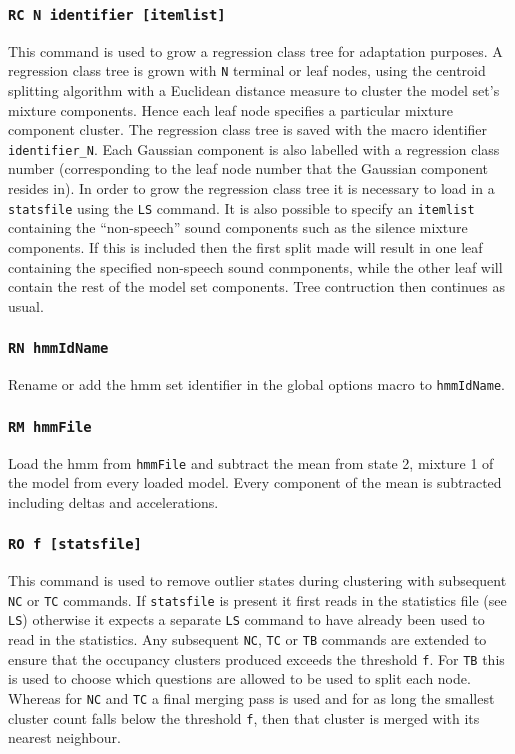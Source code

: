 \subsubsection*{\tt RC N identifier [itemlist]}

This command is used to grow a regression class tree for adaptation
purposes. A regression class tree is grown with
\texttt{N} terminal or leaf nodes, using the centroid splitting algorithm
with a Euclidean distance measure to cluster the model set's mixture
components. Hence each leaf node specifies a particular mixture
component cluster. The regression class tree is saved with the macro
identifier \texttt{identifier\_N}. Each Gaussian component is also
labelled with a regression class number (corresponding to the leaf
node number that the Gaussian component resides in). In order to grow
the regression class tree it is necessary to load in a \texttt{statsfile}
using the \texttt{LS} command. It is also possible to specify an
\texttt{itemlist} containing the ``non-speech'' sound components 
such as the silence mixture components. If this is included then the
first split made will result in one leaf containing the specified
non-speech sound conmponents, while the other leaf will contain the
rest of the model set components. Tree contruction then continues as usual.

\subsubsection*{\tt RN hmmIdName}

Rename or add the hmm set identifier in the global options macro to 
{\tt hmmIdName}.

\subsubsection*{\tt RM hmmFile}

Load the hmm from \texttt{hmmFile} and subtract the mean from state 2,
mixture 1 of the model from every loaded model.  Every component
of the mean is subtracted including deltas and accelerations.

\subsubsection*{\tt RO f [statsfile]}

This command is used to remove outlier states during clustering
with subsequent \texttt{NC} or \texttt{TC} commands.
If \texttt{statsfile} is present it first reads in the  statistics 
file (see \texttt{LS}) otherwise it expects a separate \texttt{LS} command
to have already been used to read in the statistics.
Any subsequent \texttt{NC}, \texttt{TC} or \texttt{TB} commands are
extended to ensure that the occupancy clusters produced exceeds the 
threshold \texttt{f}.
For \texttt{TB} this is used to choose which questions are allowed to
be used to split each node.   Whereas for \texttt{NC} and \texttt{TC} 
a final merging pass is used and for as long the smallest cluster count 
falls below the threshold \texttt{f}, then that cluster is merged with 
its nearest neighbour.

